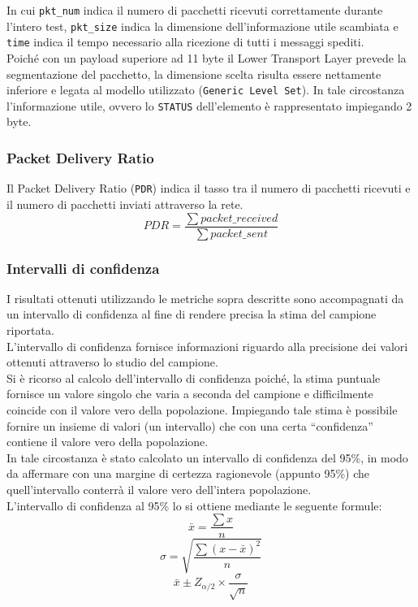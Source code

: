 \noindent In cui \texttt{pkt\_num} indica il numero di pacchetti ricevuti correttamente durante l'intero test, \texttt{pkt\_size} indica la dimensione dell'informazione utile scambiata e \texttt{time} indica il tempo necessario alla ricezione di tutti i messaggi spediti.\\
Poiché con un payload superiore ad 11 byte il Lower Transport Layer prevede la segmentazione del pacchetto, la dimensione scelta risulta essere nettamente inferiore e legata al modello utilizzato (\texttt{Generic Level Set}). In tale circostanza l'informazione utile, ovvero lo \texttt{STATUS} dell'elemento è rappresentato impiegando 2 byte.

\subsubsection{Packet Delivery Ratio}
Il Packet Delivery Ratio (\texttt{PDR}) indica il tasso tra il numero di pacchetti ricevuti e il numero di pacchetti inviati attraverso la rete. 
$$ PDR = \frac{\sum packet\_received}{\sum packet\_sent} $$

\subsubsection{Intervalli di confidenza}
I risultati ottenuti utilizzando le metriche sopra descritte sono accompagnati da un intervallo di confidenza al fine di rendere precisa la stima del campione riportata.\\
L'intervallo di confidenza fornisce informazioni riguardo alla precisione dei valori ottenuti attraverso lo studio del campione. \\
Si è ricorso al calcolo dell'intervallo di confidenza poiché, la stima puntuale fornisce un valore singolo che varia a seconda del campione e difficilmente coincide con il valore vero della popolazione. Impiegando tale stima è possibile fornire un insieme di valori (un intervallo) che con una certa ``confidenza'' contiene il valore vero della popolazione.\\
In tale circostanza è stato calcolato un intervallo di confidenza del 95\%, in modo da affermare con una margine di certezza ragionevole (appunto 95\%) che quell'intervallo conterrà il valore vero dell'intera popolazione.\\

\noindent L'intervallo di confidenza al 95\% lo si ottiene mediante le seguente formule:
$$\bar{x} = \frac{\sum x}{n}$$
$$\sigma = \sqrt{\frac{\sum (x-\bar{x})^2}{n}}$$
$$\bar{x} \pm Z_{\alpha/2} \times \frac{\sigma}{\sqrt{n}}$$

